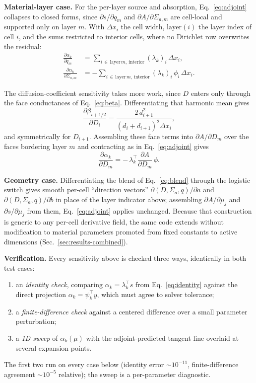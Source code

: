\documentclass[]{ANStopical}
\begin{document}
\textbf{Material-layer case.} For the per-layer source and absorption, Eq.~\eqref{eq:adjoint} collapses to closed forms, since $\partial s/\partial q_m$ and $\partial A/\partial\Sigma_{a,m}$ are cell-local and supported only on layer $m$. With $\Delta x_i$ the cell width, $\mathrm{layer}(i)$ the layer index of cell $i$, and the sums restricted to interior cells, where no Dirichlet row overwrites the residual:
\begin{align}
    \frac{\partial\alpha_k}{\partial q_m} &= \sum_{i\,\in\,\mathrm{layer}\,m,\ \mathrm{interior}} (\lambda_k)_i\,\Delta x_i,
    \label{eq:dq} \\
    \frac{\partial\alpha_k}{\partial\Sigma_{a,m}} &= -\sum_{i\,\in\,\mathrm{layer}\,m,\ \mathrm{interior}} (\lambda_k)_i\,\phi_i\,\Delta x_i.
    \label{eq:dsig}
\end{align}

The diffusion-coefficient sensitivity takes more work, since $D$ enters only through the face conductances of Eq.~\eqref{eq:beta}. Differentiating that harmonic mean gives
\begin{equation}
    \frac{\partial\beta_{i+1/2}}{\partial D_i} = \frac{2\,d_{i+1}^2}{\left(d_i+d_{i+1}\right)^2\Delta x_i},
    \label{eq:dbeta}
\end{equation}
and symmetrically for $D_{i+1}$. Assembling these face terms into $\partial A/\partial D_m$ over the faces bordering layer $m$ and contracting as in Eq.~\eqref{eq:adjoint} gives
\begin{equation}
    \frac{\partial\alpha_k}{\partial D_m} = -\,\lambda_k^\top \frac{\partial A}{\partial D_m}\,\phi .
    \label{eq:dD}
\end{equation}

\textbf{Geometry case.} Differentiating the blend of Eq.~\eqref{eq:blend} through the logistic switch gives smooth per-cell ``direction vectors'' $\partial(D,\Sigma_a,q)/\partial a$ and $\partial(D,\Sigma_a,q)/\partial b$ in place of the layer indicator above; assembling $\partial A/\partial\mu_j$ and $\partial s/\partial\mu_j$ from them, Eq.~\eqref{eq:adjoint} applies unchanged. Because that construction is generic to any per-cell derivative field, the same code extends without modification to material parameters promoted from fixed constants to active dimensions (Sec.~\ref{sec:results-combined}).

\textbf{Verification.} Every sensitivity above is checked three ways, identically in both test cases:
\begin{enumerate}
    \item an \emph{identity check}, comparing $\alpha_k=\lambda_k^\top s$ from Eq.~\eqref{eq:identity} against the direct projection $\alpha_k=\psi_k^\top y$, which must agree to solver tolerance;
    \item a \emph{finite-difference check} against a centered difference over a small parameter perturbation;
    \item a \emph{1D sweep} of $\alpha_k(\mu)$ with the adjoint-predicted tangent line overlaid at several expansion points.
\end{enumerate}
The first two run on every case below (identity error $\sim10^{-11}$, finite-difference agreement $\sim10^{-5}$ relative); the sweep is a per-parameter diagnostic.
\end{document}

